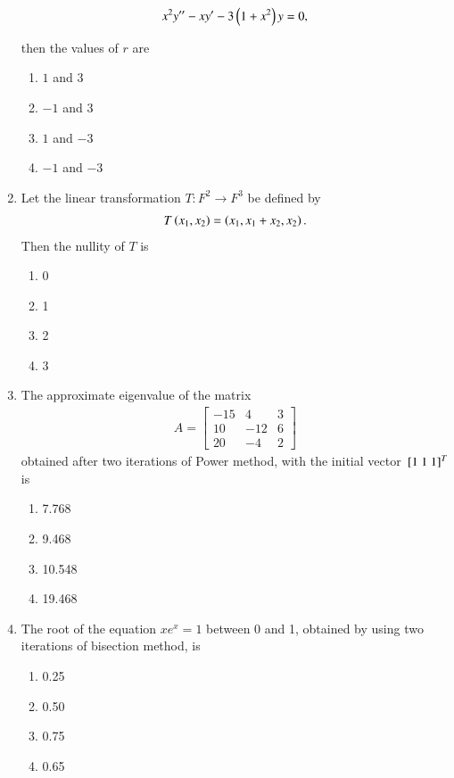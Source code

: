 \documentclass[journal,12pt,twocolumn]{IEEEtran}
\theoremstyle{remark}
\begin{document}
\begin{enumerate}
	\begin{align}
		x^2 y^{\prime \prime} - xy^{\prime} - 3 \left(1 + x^2\right) y = 0,
	\end{align}

then the values of $r$ are
\begin{enumerate}
    \item $1$ and $3$
    \item $-1$ and $3$
    \item $1$ and $-3$
    \item $-1$ and $-3$
\end{enumerate}
\item Let the linear transformation $T : F^2 \rightarrow F^3$ be defined by
\begin{align}
T \left(x_1, x_2\right) = \left(x_1, x_1 + x_2, x_2\right).
\end{align}
Then the nullity of $T$ is

\begin{enumerate}
    \item 0
    \item 1
    \item 2
    \item 3
\end{enumerate}

\item The approximate eigenvalue of the matrix
\begin{align}
A = \begin{bmatrix}
-15 & 4 & 3 \\
10 & -12 & 6 \\
20 & -4 & 2 
\end{bmatrix}
\end{align}
obtained after two iterations of Power method, with the initial vector ${}\left[1 \ 1 \ 1\right]^T$ is

\begin{enumerate}
    \item 7.768
    \item 9.468
    \item 10.548
    \item 19.468
\end{enumerate}
\item The root of the equation $x e^x = 1$ between 0 and 1, obtained by using two iterations of bisection method, is
\begin{enumerate}
    \item 0.25
    \item 0.50
    \item 0.75
    \item 0.65
\end{enumerate}


\end{enumerate}
\end{document}
